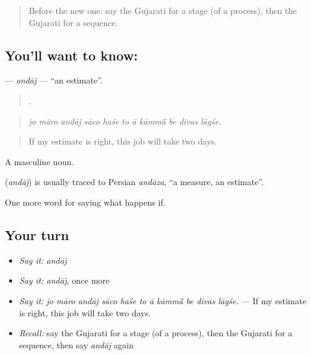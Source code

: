 \label{lesson:GU-C529-andaj}



\begin{quote}
Before the new one: say the Gujarati for a stage (of a process), then the Gujarati for a sequence.
\end{quote}

\subsection*{You'll want to know: }
\textbf{} — \emph{andāj} — \textquotedblleft{}an estimate\textquotedblright{}.

\begin{quote}
          .
\end{quote}

\begin{quote}
\emph{jo māro andāj sāco haśe to ā kāmmā̃ be divas lāgśe.}
\end{quote}

\begin{quote}
If my estimate is right, this job will take two days.
\end{quote}

A masculine noun.

\begin{cousinweb}
\textbf{} (\emph{andāj}) is usually traced to Persian \emph{andāza}, \textquotedblleft{}a measure, an estimate\textquotedblright{}.
\end{cousinweb}

\begin{grammarlens}[title={What you've built}]
One more word for saying what happens if.
\end{grammarlens}

\subsection*{Your turn}
\begin{itemize}
\raggedright
  \item \emph{Say it:} \emph{andāj}
  \item \emph{Say it:} \emph{andāj}, once more
  \item \emph{Say it:} \emph{jo māro andāj sāco haśe to ā kāmmā̃ be divas lāgśe.} — If my estimate is right, this job will take two days.
  \item \emph{Recall:} say the Gujarati for a stage (of a process), then the Gujarati for a sequence, then say \emph{andāj} again
\end{itemize}


